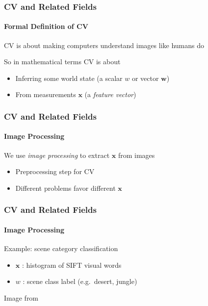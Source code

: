 \documentclass[xetex,professionalfont]{beamer}
\renewcommand{\vec}[1]{\ensuremath{\mathbf{#1}}}
\newcommand{\vw}{\vec{w}}
\newcommand{\vx}{\vec{x}}
\begin{document}
\begin{frame}
\frametitle{CV and Related Fields}
\framesubtitle{Formal Definition of CV}

CV is about making computers understand images like humans do

\bigskip
So in mathematical terms CV is about
\begin{itemize}
    \item Inferring some world state (a scalar $w$ or vector $\vw$)
    \item From measurements $\vx$ (a \emph{feature vector})
\end{itemize}

\end{frame}


\begin{frame}
\frametitle{CV and Related Fields}
\framesubtitle{Image Processing}

We use \emph{image processing} to extract $\vx$ from images
\begin{itemize}
    \item Preprocessing step for CV
    \item Different problems favor different $\vx$
\end{itemize}

\end{frame}


\begin{frame}
\frametitle{CV and Related Fields}
\framesubtitle{Image Processing}

Example: scene category classification
\begin{itemize}
    \item $\vx$ : histogram of SIFT visual words
    \item $w$ : scene class label (e.g.\ desert, jungle)
\end{itemize}

\begin{center}
    {\centering Image from \cite{prince12}}
\end{center}

\end{frame}
\end{document}
